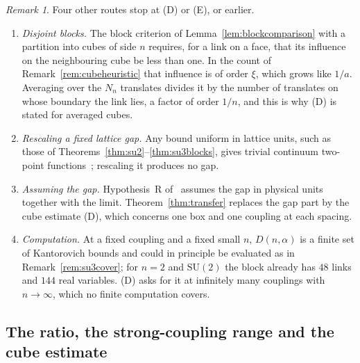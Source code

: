 \documentclass[aps,prd,twocolumn,superscriptaddress,nofootinbib,longbibliography,floatfix,amsmath,amssymb,10pt]{revtex4-2}
\theoremstyle{definition}
\theoremstyle{remark}
\newtheorem{remark}[theorem]{Remark}
\newcommand{\SU}{\mathrm{SU}}
\begin{document}
\begin{remark}\label{rem:routes}
Four other routes stop at (D) or (E), or earlier.
\begin{enumerate}[label=\textup{(\alph*)},leftmargin=*]
\item \emph{Disjoint blocks.} The block criterion of
Lemma~\ref{lem:blockcomparison} with a partition into cubes of side $n$
requires, for a link on a face, that its influence on the neighbouring cube
be less than one. In the count of Remark~\ref{rem:cubeheuristic} that
influence is of order $\xi$, which grows like $1/a$. Averaging over the $N_n$
translates divides it by the number of translates on whose boundary the link
lies, a factor of order $1/n$, and this is why (D) is stated for averaged
cubes.
\item \emph{Rescaling a fixed lattice gap.} Any bound uniform in lattice
units, such as those of Theorems~\ref{thm:su2}--\ref{thm:su3blocks}, gives
trivial continuum two-point functions~\cite{BB26b}; rescaling it produces
no gap.
\item \emph{Assuming the gap.} Hypothesis~R of~\cite{BB26b} assumes the gap
in physical units together with the limit. Theorem~\ref{thm:transfer}
replaces the gap part by the cube estimate (D), which concerns one box and
one coupling at each spacing.
\item \emph{Computation.} At a fixed coupling and a fixed small $n$,
$D(n,\alpha)$ is a finite set of Kantorovich bounds and could in principle be
evaluated as in Remark~\ref{rem:su3cover}; for
$n=2$ and $\SU(2)$ the block already has $48$ links and $144$ real variables.
(D) asks for it at infinitely many couplings with $n\to\infty$, which no
finite computation covers.
\end{enumerate}
\end{remark}














\subsection{The ratio, the strong-coupling range and the cube estimate}\label{ssec:ratiocube}
\end{document}

